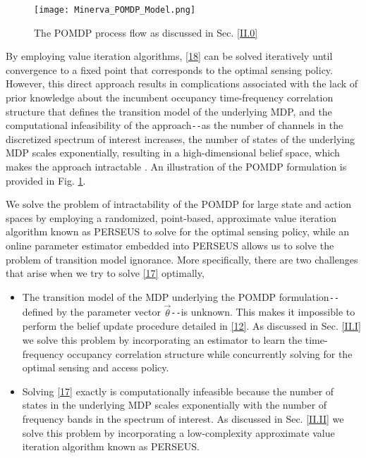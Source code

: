 \documentclass[12pt, draftcls, onecolumn]{IEEEtran}
\begin{document}
\begin{figure} [htb]
    \centerline{
    \texttt{[image: Minerva\_POMDP\_Model.png]}}
    \caption{The POMDP process flow as discussed in Sec. \ref{II.0}}
    \label{fig: A.add-1}
\end{figure}
By employing value iteration algorithms, \eqref{18} can be solved iteratively until convergence to a fixed point that corresponds to the optimal sensing policy. However, this direct approach results in complications associated with the lack of prior knowledge about the incumbent occupancy time-frequency correlation structure that defines the transition model of the underlying MDP, and the computational infeasibility of the approach\texttt{-{}-}as the number of channels in the discretized spectrum of interest increases, the number of states of the underlying MDP scales exponentially, resulting in a high-dimensional belief space, which makes the approach intractable . An illustration of the POMDP formulation is provided in Fig. \ref{fig: A.add-1}.

We solve the problem of intractability of the POMDP for large state and action spaces by employing a randomized, point-based, approximate value iteration algorithm known as PERSEUS \cite{WCL:13} to solve for the optimal sensing policy, while an online parameter estimator embedded into PERSEUS allows us to solve the problem of transition model ignorance. More specifically, there are two challenges that arise when we try to solve \eqref{17} optimally,
\begin{itemize}
    \item The transition model of the MDP underlying the POMDP formulation\texttt{-{}-}defined by the parameter vector $\vec{\theta}$\texttt{-{}-}is unknown. This makes it impossible to perform the belief update procedure detailed in \eqref{12}. As discussed in Sec. \ref{II.I} we solve this problem by incorporating an estimator to learn the time-frequency occupancy correlation structure while concurrently solving for the optimal sensing and access policy.
    \item Solving \eqref{17} exactly is computationally infeasible because the number of states in the underlying MDP scales exponentially with the number of frequency bands in the spectrum of interest. As discussed in Sec. \ref{II.II} we solve this problem by incorporating a low-complexity approximate value iteration algorithm known as PERSEUS.
\end{itemize}
 
\end{document}
